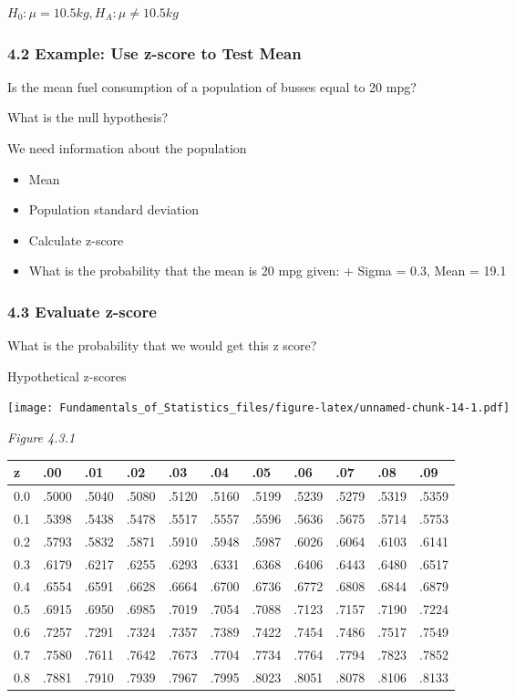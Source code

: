 \documentclass[]{article}
\providecommand{\tightlist}{%
  \setlength{\itemsep}{0pt}\setlength{\parskip}{0pt}}
\begin{document}
\(H_0: \mu = 10.5 kg, H_A:\mu \ne 10.5 kg\)

\hypertarget{example-use-z-score-to-test-mean}{%
\subsubsection{4.2 Example: Use z-score to Test
Mean}\label{example-use-z-score-to-test-mean}}

Is the mean fuel consumption of a population of busses equal to 20 mpg?

What is the null hypothesis?

We need information about the population

\begin{itemize}
\tightlist
\item
  Mean
\item
  Population standard deviation
\item
  Calculate z-score
\item
  What is the probability that the mean is 20 mpg given: + Sigma = 0.3,
  Mean = 19.1
\end{itemize}

\hypertarget{evaluate-z-score}{%
\subsubsection{4.3 Evaluate z-score}\label{evaluate-z-score}}

What is the probability that we would get this z score?

Hypothetical z-scores

\texttt{[image: Fundamentals\_of\_Statistics\_files/figure-latex/unnamed-chunk-14-1.pdf]}

\emph{Figure 4.3.1}

\begin{longtable}[]{@{}lllllllllll@{}}
\toprule
z & .00 & .01 & .02 & .03 & .04 & .05 & .06 & .07 & .08 &
.09\tabularnewline
\midrule
\endhead
0.0 & .5000 & .5040 & .5080 & .5120 & .5160 & .5199 & .5239 & .5279 &
.5319 & .5359\tabularnewline
0.1 & .5398 & .5438 & .5478 & .5517 & .5557 & .5596 & .5636 & .5675 &
.5714 & .5753\tabularnewline
0.2 & .5793 & .5832 & .5871 & .5910 & .5948 & .5987 & .6026 & .6064 &
.6103 & .6141\tabularnewline
0.3 & .6179 & .6217 & .6255 & .6293 & .6331 & .6368 & .6406 & .6443 &
.6480 & .6517\tabularnewline
0.4 & .6554 & .6591 & .6628 & .6664 & .6700 & .6736 & .6772 & .6808 &
.6844 & .6879\tabularnewline
0.5 & .6915 & .6950 & .6985 & .7019 & .7054 & .7088 & .7123 & .7157 &
.7190 & .7224\tabularnewline
0.6 & .7257 & .7291 & .7324 & .7357 & .7389 & .7422 & .7454 & .7486 &
.7517 & .7549\tabularnewline
0.7 & .7580 & .7611 & .7642 & .7673 & .7704 & .7734 & .7764 & .7794 &
.7823 & .7852\tabularnewline
0.8 & .7881 & .7910 & .7939 & .7967 & .7995 & .8023 & .8051 & .8078 &
.8106 & .8133\tabularnewline
\bottomrule
\end{longtable}
\end{document}
